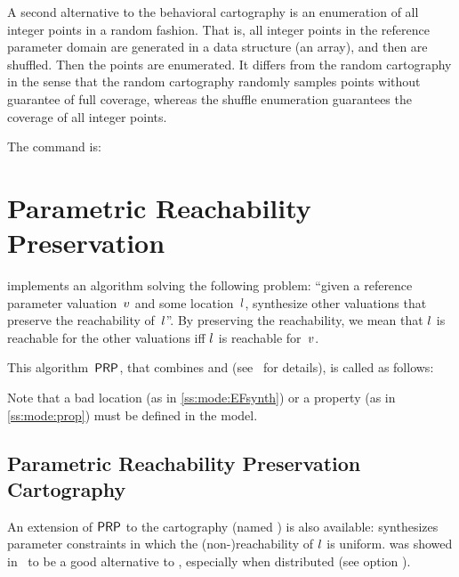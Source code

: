 A second alternative to the behavioral cartography is an enumeration of all integer points in a random fashion.
That is, all integer points in the reference parameter domain are generated in a data structure (an array), and then are shuffled.
Then the points are enumerated.
It differs from the random cartography in the sense that the random cartography randomly samples points without guarantee of full coverage, whereas the shuffle enumeration guarantees the coverage of all integer points.

The command is:



\section{Parametric Reachability Preservation}\label{ss:mode:PRP}

\imitator{} implements an algorithm solving the following problem:
``given a reference parameter valuation~$v$ and some location~$l$, synthesize other valuations that preserve the reachability of~$l$''.
By preserving the reachability, we mean that $l$ is reachable for the other valuations iff $l$ is reachable for~$v$.

This algorithm~$\mathsf{PRP}$, that combines \EFsynth{} and \IM{} (see~\cite{ALNS15} for details), is called as follows:


Note that a bad location (as in \cref{ss:mode:EFsynth}) or a property (as in \cref{ss:mode:prop}) must be defined in the model.


\subsection*{Parametric Reachability Preservation Cartography}

An extension of $\mathsf{PRP}$ to the cartography (named \PRPC{}) is also available: \PRPC{} synthesizes parameter constraints in which the (non-)reachability of $l$ is uniform.
\PRPC{} was showed in~\cite{ALNS15} to be a good alternative to \EFsynth{}, especially when distributed (see option ).


